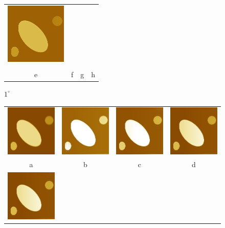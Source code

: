 \documentclass{procDDs}
\begin{document}
\begin{figure}[h!]
\begin{tabular}{cccc}
		\includegraphics[width=0.2\linewidth]{img/5/9.jpg}\\
		\\
		e & f & g & h		
	\end{tabular}
	\caption{$1^\circ$}
	\label{ris:desc1}
\end{figure}
\begin{figure}[h!]\center%
	\label{ris:desc2}
	\begin{tabular}{cccc}
		\includegraphics[width=0.2\linewidth]{img/6/1.jpg}&
		\includegraphics[width=0.2\linewidth]{img/6/3.jpg}&
		\includegraphics[width=0.2\linewidth]{img/6/4.jpg}&
		\includegraphics[width=0.2\linewidth]{img/6/5.jpg}\\
		a & b & c & d \\
		\includegraphics[width=0.2\linewidth]{img/6/5.jpg}&

\end{tabular}
\end{figure}
\end{document}
